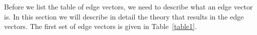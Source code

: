 %
%
%
%
%




\makeappendices
{}
\label{chap:appendix}


\label{sec:edge-def}

Before we list the table of edge vectors, we need to describe what an
edge vector is.  In this section we will describe in detail the theory
that results in the edge vectors.  The first set of edge vectors is
given in Table~\ref{table1}.

